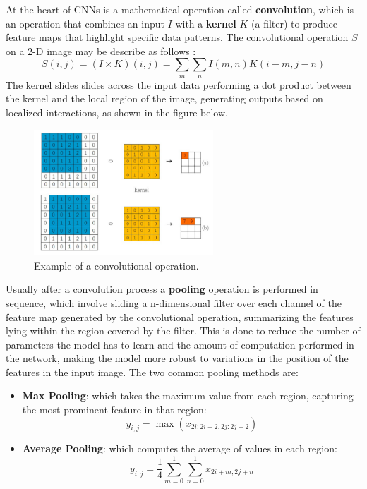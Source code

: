 At the heart of CNNs is a mathematical operation called \textbf{convolution}, which is an operation that combines an input $I$ with a \textbf{kernel} $K$ (a filter) to produce feature maps that highlight specific data patterns. The  convolutional operation $S$ on a 2-D image may be describe as follows \cite{lecun1989generalization}:
\[
S(i, j) = (I \times K)(i, j) = \sum_m \sum_n I(m, n) K(i - m, j - n)
\]
The kernel slides slides across the input data performing a dot product between the kernel and the local region of the image, generating outputs based on localized interactions, as shown in the figure below.
\begin{figure}[H] 
    \centering
    \includegraphics[width=0.6\textwidth]{Machine_learning_thesis/Images/Convolution.png}
    \caption{Example of a convolutional operation.} 
    \label{fig:convolution} 
\end{figure}
Usually after a convolution process a \textbf{pooling} operation is performed in sequence, which involve sliding a n-dimensional filter over each channel of the feature map generated by the convolutional operation, summarizing the features lying within the region covered by the filter. This is done to  reduce the number of parameters the model has to learn and the amount of computation performed in the network, making the model more robust to variations in the position of the features in the input image. The two common pooling methods are:
\begin{itemize}
    \item \textbf{Max Pooling}: which takes the maximum value from each region, capturing the most prominent feature in that region:
    \[
    y_{i,j} = \max(x_{2i:2i+2, 2j:2j+2})
    \]
    \item \textbf{Average Pooling}: which computes the average of values in each region:
    \[
    y_{i,j} = \frac{1}{4} \sum_{m=0}^{1} \sum_{n=0}^{1} x_{2i+m, 2j+n}
    \]
\end{itemize}
